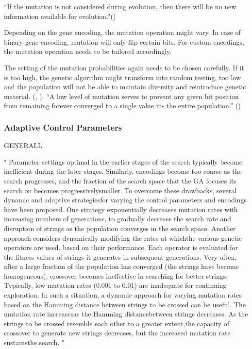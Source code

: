 \enquote{If the mutation is not considered during evolution, then there will be no new information available for evolution.}(\cite{katoch_review_2021})

Depending on the gene encoding, the mutation operation might vary. In case of binary gene encoding, mutation will only flip certain bits. For custom encodings, the mutation operation needs to be tailored accordingly.

The setting of the mutation probabilities again needs to be chosen carefully. If it is too high, the genetic algorithm might transform into random testing, too low and the population will not be able to maintain diversity and reintroduce genetic material. (\cite{klampfl_using_nodate}, \cite{grefenstette_optimization_1986}). 
\enquote{A low level of mutation serves to prevent any given bit position from remaining forever converged to a single value in- the entire population.} (\cite{grefenstette_optimization_1986})


\iffalse
\subsubsection{Adaptive Control Parameters}

GEŅERALL

"
Parameter settings optimal in the earlier stages of the search typically become inefficient during the later stages. Similarly, encodings become too coarse as the search progresses, and the fraction of the search space that the GA focuses its search on becomes progressivelysmaller. To overcome these drawbacks, several dynamic and adaptive strategiesfor varying the control parameters and encodings have been proposed. One strategy exponentially decreases mutation rates with increasing numbers of generations, to gradually decrease the search rate and disruption of strings as the population converges in the search space. Another approach considers dynamically modifying the rates at whichthe various genetic operators are used, based on their performance. Each operator is evaluated for the fitness values of strings it generates in subsequent generations. Very often, after a large fraction of the population has converged (the strings have become homogeneous), crossover becomes ineffective in searching for better strings. Typically, low mutation rates (0.001 to 0.01) are inadequate for continuing exploration. In such a situation, a dynamic approach for varying mutation rates based on the Hamming distance between strings to be crossed can be useful. The mutation rate increasesas the Hamming distancebetween strings decreases. As the strings to be crossed resemble each other to a greater extent,the capacity of crossover to generate new strings decreases, but the increased mutation rate sustainsthe search.
"\cite{srinivas_genetic_1994}


